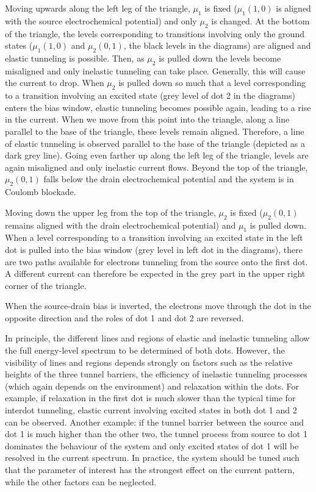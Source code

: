 \documentclass[rmp,twocolumn,aps]{revtex4}
\begin{document}
Moving upwards along the left leg of the triangle, $\mu _{1}$ is
fixed ($\mu _{1}(1,0)$ is aligned with the source electrochemical
potential) and only $\mu _{2}$ is changed. At the bottom of the
triangle, the levels corresponding to transitions involving only
the ground states ($\mu _{1}(1,0)$ and $\mu _{2}(0,1)$, the black
levels in the diagrams) are aligned and elastic tunneling is
possible. Then, as $\mu _{2}$ is pulled down the levels become
misaligned and only inelastic tunneling can take place. Generally,
this will cause the current to drop. When $\mu _{2}$ is pulled
down so much that a level corresponding to a transition involving
an excited state (grey level of dot 2 in the diagrams) enters the
bias window, elastic tunneling becomes possible again, leading to
a rise in the current. When we move from this point into the
triangle, along a line parallel to the base of the triangle, these
levels remain aligned. Therefore, a line of elastic tunneling is
observed parallel to the base of the triangle (depicted as a dark
grey line). Going even farther up along the left leg of the
triangle, levels are again misaligned and only inelastic current
flows. Beyond the top of the triangle, $\mu _{2}(0,1)$ falls below
the drain electrochemical potential and the system is in Coulomb
blockade.

Moving down the upper leg from the top of the triangle, $\mu _{2}$
is fixed ($\mu _{2}(0,1)$ remains aligned with the drain
electrochemical potential) and $\mu _{1}$ is pulled down. When a
level corresponding to a transition involving an excited state in
the left dot is pulled into the bias window (grey level in left
dot in the diagrams), there are two paths available for electrons
tunneling from the source onto the first dot. A different current
can therefore be expected in the grey part in the upper right
corner of the triangle.

When the source-drain bias is inverted, the electrons move through
the dot in the opposite direction and the roles of dot 1 and dot 2 are
reversed.

In principle, the different lines and regions of elastic and
inelastic tunneling allow the full energy-level spectrum to be
determined of both dots. However, the visibility of lines and
regions depends strongly on factors such as the relative heights
of the three tunnel barriers, the efficiency of inelastic
tunneling processes (which again depends on the environment) and
relaxation within the dots. For example, if relaxation in the
first dot is much slower than the typical time for interdot
tunneling, elastic current involving excited states in both dot 1
and 2 can be observed. Another example: if the tunnel barrier
between the source and dot 1 is much higher than the other two, the
tunnel process from source to dot 1 dominates the behaviour of the
system and only excited states of dot 1 will be resolved in the
current spectrum. In practice, the system should be tuned such
that the parameter of interest has the strongest effect on the
current pattern, while the other factors can be neglected.
\end{document}
